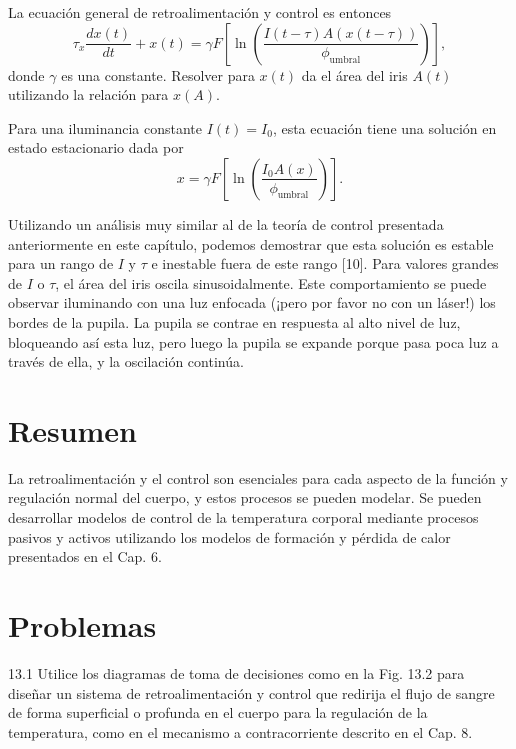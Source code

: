 \documentclass[12pt]{book}
\begin{document}
La ecuación general de retroalimentación y control es entonces
\begin{equation}
  \tau_x \frac{dx(t)}{dt} + x(t) = \gamma F \left[ \ln \left( \frac{I(t - \tau) A(x(t - \tau))}{\phi_{\text{umbral}}} \right) \right], \label{eq:13.39}
\end{equation}
donde $\gamma$ es una constante. Resolver para $x(t)$ da el área del iris $A(t)$ utilizando la relación para $x(A)$.

Para una iluminancia constante $I(t) = I_0$, esta ecuación tiene una solución en estado estacionario dada por
\begin{equation}
  x = \gamma F \left[ \ln \left( \frac{I_0 A(x)}{\phi_{\text{umbral}}} \right) \right]. \label{eq:13.40}
\end{equation}

Utilizando un análisis muy similar al de la teoría de control presentada anteriormente en este capítulo, podemos demostrar que esta solución es estable para un rango de $I$ y $\tau$ e inestable fuera de este rango [10]. Para valores grandes de $I$ o $\tau$, el área del iris oscila sinusoidalmente. Este comportamiento se puede observar iluminando con una luz enfocada (¡pero por favor no con un láser!) los bordes de la pupila. La pupila se contrae en respuesta al alto nivel de luz, bloqueando así esta luz, pero luego la pupila se expande porque pasa poca luz a través de ella, y la oscilación continúa.

\section{Resumen}
\label{sec:13.3}

La retroalimentación y el control son esenciales para cada aspecto de la función y regulación normal del cuerpo, y estos procesos se pueden modelar. Se pueden desarrollar modelos de control de la temperatura corporal mediante procesos pasivos y activos utilizando los modelos de formación y pérdida de calor presentados en el Cap. 6.

\section*{Problemas}

13.1 Utilice los diagramas de toma de decisiones como en la Fig. 13.2 para diseñar un sistema de retroalimentación y control que redirija el flujo de sangre de forma superficial o profunda en el cuerpo para la regulación de la temperatura, como en el mecanismo a contracorriente descrito en el Cap. 8.
\end{document}
